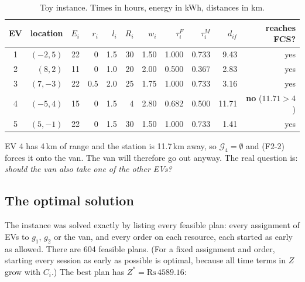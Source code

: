 \documentclass[11pt,a4paper]{article}
\newcommand{\G}{\mathcal{G}}
\newcommand{\Rs}{\text{Rs}\,}
\begin{document}
\begin{table}[h]
\centering
\renewcommand{\arraystretch}{1.15}
\begin{tabular}{@{}crrrrrrrrrr@{}}
\toprule
EV & location & $E_i$ & $r_i$ & $l_i$ & $R_i$ & $w_i$ & $\tau^F_i$ & $\tau^M_i$ & $d_{if}$ & reaches FCS? \\
\midrule
1 & $(-2,5)$ & 22 & 0 & 1.5 & 30 & 1.50 & 1.000 & 0.733 & 9.43 & yes \\
2 & $(8,2)$ & 11 & 0 & 1.0 & 20 & 2.00 & 0.500 & 0.367 & 2.83 & yes \\
3 & $(7,-3)$ & 22 & 0.5 & 2.0 & 25 & 1.75 & 1.000 & 0.733 & 3.16 & yes \\
4 & $(-5,4)$ & 15 & 0 & 1.5 & 4 & 2.80 & 0.682 & 0.500 & 11.71 & \textbf{no} ($11.71>4$) \\
5 & $(5,-1)$ & 22 & 0 & 1.5 & 30 & 1.50 & 1.000 & 0.733 & 1.41 & yes \\
\bottomrule
\end{tabular}
\caption{Toy instance. Times in hours, energy in kWh, distances in km.}\label{tab:toydata}
\end{table}

EV 4 has 4\,km of range and the station is 11.7\,km away, so $\G_4=\emptyset$ and (F2-2) forces it onto the van. The van will therefore go out anyway. The real question is: \emph{should the van also take one of the other EVs?}

\subsection{The optimal solution}
The instance was solved exactly by listing every feasible plan: every assignment of EVs to $g_1$, $g_2$ or the van, and every order on each resource, each started as early as allowed. There are 604 feasible plans. (For a fixed assignment and order, starting every session as early as possible is optimal, because all time terms in $Z$ grow with $C_i$.) The best plan has $Z^*=\Rs4589.16$:
\end{document}
